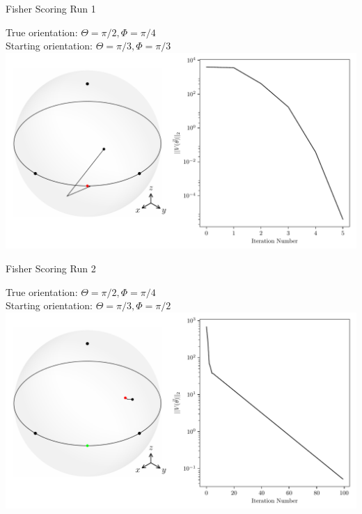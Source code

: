 \documentclass[presentation]{beamer}
\begin{document}
\begin{frame}[label=sec-3]{Fisher Scoring Run 1}
\begin{center}
True orientation: $\Theta = \pi/2, \Phi = \pi/4$\\
Starting orientation: $\Theta = \pi/3, \Phi = \pi/3$
  \includegraphics[width=1.0\textwidth, interpolate=true]{figs/recon-history1.pdf}
\end{center}
\end{frame}
\begin{frame}[label=sec-4]{Fisher Scoring Run 2}
\begin{center}
True orientation: $\Theta = \pi/2, \Phi = \pi/4$\\
Starting orientation: $\Theta = \pi/3, \Phi = \pi/2$
  \includegraphics[width=1.0\textwidth, interpolate=true]{figs/recon-history2.pdf}
\end{center}
\end{frame}
\end{document}
